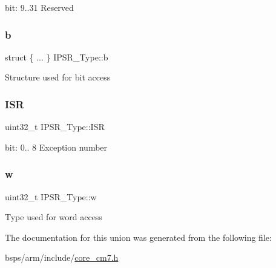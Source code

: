 bit\+: 9..31 Reserved \mbox{\label{unionIPSR__Type_afe1256bc03b84b5c0fdf602f26eb4707}} 
\subsubsection{\texorpdfstring{b}{b}}
{\footnotesize\ttfamily struct \{ ... \}   I\+P\+S\+R\+\_\+\+Type\+::b}

Structure used for bit access \mbox{\label{unionIPSR__Type_ab46e5f1b2f4d17cfb9aca4fffcbb2fa5}} 
\subsubsection{\texorpdfstring{ISR}{ISR}}
{\footnotesize\ttfamily uint32\+\_\+t I\+P\+S\+R\+\_\+\+Type\+::\+I\+SR}

bit\+: 0.. 8 Exception number \mbox{\label{unionIPSR__Type_a4adca999d3a0bc1ae682d73ea7cfa879}} 
\subsubsection{\texorpdfstring{w}{w}}
{\footnotesize\ttfamily uint32\+\_\+t I\+P\+S\+R\+\_\+\+Type\+::w}

Type used for word access 

The documentation for this union was generated from the following file\+:\begin{DoxyCompactItemize}
\item 
bsps/arm/include/\mbox{\hyperlink{core__cm7_8h}{core\+\_\+cm7.\+h}}\end{DoxyCompactItemize}
